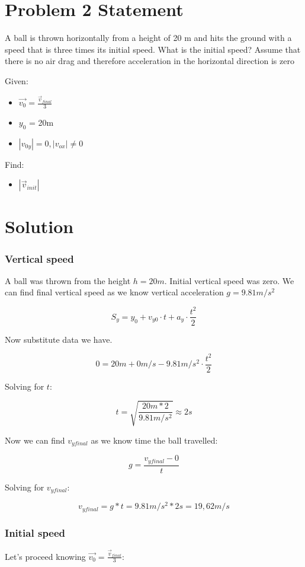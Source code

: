 \section*{Problem 2 Statement}

A ball is thrown horizontally from a height of 20 m and hits the ground with a speed that is three
times its initial speed. What is the initial speed? Assume that there is no air drag and therefore
acceleration in the horizontal direction is zero 

\bigbreak Given:
\begin{itemize}
    \item $\vec{v_0} = \frac{\vec{v}_{final}}{3}$
    \item $y_0$ = 20m
    \item $|v_{0y}| = 0, |v_{ox}| \neq 0$
\end{itemize}

Find:
\begin{itemize}
    \item $|\vec{v}_{init}|$
\end{itemize}

\section*{Solution}
\subsubsection*{Vertical speed}

A ball was thrown from the height $h = 20m$. Initial vertical speed was zero.
We can find final vertical speed as we know vertical acceleration $g = 9.81m/s^2$

$$ S_y = y_0 + v_{y0} \cdot t + a_y \cdot \frac{t^2}{2}$$

Now substitute data we have.

$$ 0 = 20m + 0m/s - 9.81m/s^2 \cdot \frac{t^2}{2}$$

Solving for $t$:

$$t = \sqrt{\frac{20m * 2}{9.81m/s^2}} \approx 2s$$

Now we can find $v_{yfinal}$ as we know time the ball travelled:

$$ g = \frac{v_{yfinal} - 0}{t}$$

Solving for $v_{yfinal}$:

$$v_{yfinal} = g * t = 9.81m/s^2 * 2s = 19,62m/s$$

\subsubsection*{Initial speed}
Let's proceed knowing $\vec{v_0} = \frac{\vec{v}_{final}}{3}$:

